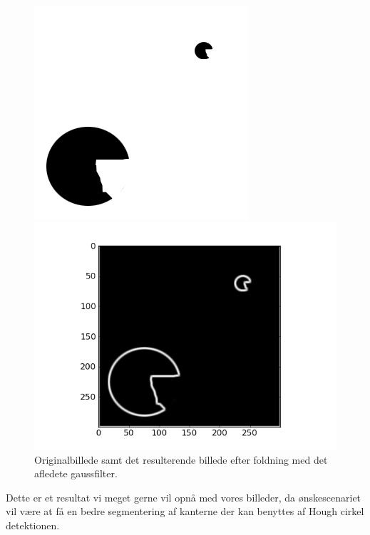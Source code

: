 \begin{figure}[H]
	\begin{minipage}[b]{0.5\linewidth}
		\centering
		\includegraphics[scale=1.3]{files/premethod/img/gauss_derived_circ1.png}
	\end{minipage}
	\hspace{0.5cm}
	\begin{minipage}[b]{0.5\linewidth}
		\centering
		\includegraphics[scale=0.5]{files/premethod/img/gauss_derived_circ2.png}
	\end{minipage}
	\caption{Originalbillede samt det resulterende billede efter foldning med det afledete gaussfilter.\label{fig:premethod_gaussCirc}}
\end{figure}

Dette er et resultat vi meget gerne vil opnå med vores billeder, da ønskescenariet vil være at få en bedre segmentering af kanterne der kan benyttes af Hough cirkel detektionen.

